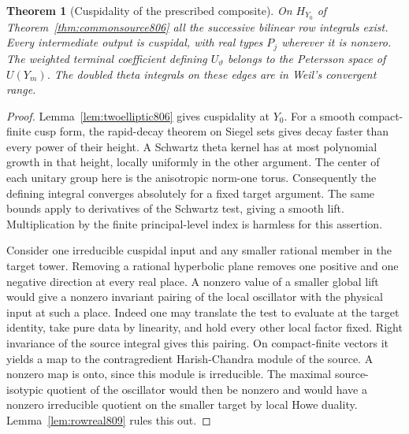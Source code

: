 \documentclass[a4paper,11pt]{article}
\newtheorem{theorem}[proposition]{Theorem}
\theoremstyle{definition}
\theoremstyle{remark}
\numberwithin{equation}{section}
\begin{document}
\begin{theorem}[Cuspidality of the prescribed composite]
\leavevmode\label{thm:rowcuspidal809}
On \(H_{Y_0}\) of Theorem~\ref{thm:commonsource806} all the
successive bilinear row integrals exist. Every intermediate output
is cuspidal, with real types \(P_j\) wherever it is nonzero.
The weighted terminal coefficient defining \(U_\vartheta\) belongs
to the Petersson space of \(U(Y_m)\). The doubled theta integrals
on these edges are in Weil's convergent range.
\end{theorem}
\begin{proof}
Lemma~\ref{lem:twoelliptic806} gives cuspidality at \(Y_0\).
For a smooth compact-finite cusp form, the rapid-decay theorem
on Siegel sets gives decay faster than every power of their
height. A Schwartz theta kernel has at most polynomial growth
in that height, locally uniformly in the other argument. The
center of each unitary group here is the anisotropic norm-one
torus. Consequently the defining integral converges absolutely
for a fixed target argument. The same bounds apply to derivatives
of the Schwartz test, giving a smooth lift. Multiplication by
the finite principal-level index is harmless for this assertion.

Consider one irreducible cuspidal input and any smaller rational
member in the target tower. Removing a rational hyperbolic plane
removes one positive and one negative direction at every real
place. A nonzero value of a smaller global lift would give a
nonzero invariant pairing of the local oscillator with the
physical input at such a place. Indeed one may translate the
test to evaluate at the target identity, take pure data by
linearity, and hold every other local factor fixed. Right
invariance of the source integral gives this pairing. On
compact-finite vectors it yields a map to the contragredient
Harish-Chandra module of the source. A nonzero map is onto,
since this module is irreducible. The maximal source-isotypic
quotient of the oscillator would then be nonzero and would
have a nonzero irreducible quotient on the smaller target by
local Howe duality. Lemma~\ref{lem:rowreal809} rules this out.


\end{proof}
\end{document}
